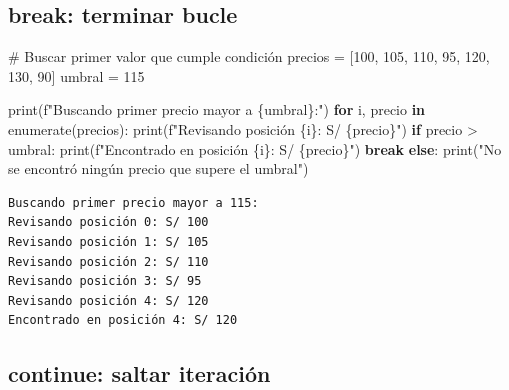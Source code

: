 \documentclass[
  doc,
  floatsintext,
  longtable,
  a4paper,
  nolmodern,
  notxfonts,
  notimes,
  12pt,
  colorlinks=true,linkcolor=blue,citecolor=blue,urlcolor=blue]{apa7}
\newenvironment{Shaded}{\begin{snugshade}}{\end{snugshade}}
\newcommand{\BuiltInTok}[1]{\textcolor[rgb]{0.00,0.23,0.31}{#1}}
\newcommand{\CommentTok}[1]{\textcolor[rgb]{0.37,0.37,0.37}{#1}}
\newcommand{\ControlFlowTok}[1]{\textcolor[rgb]{0.00,0.23,0.31}{\textbf{#1}}}
\newcommand{\DecValTok}[1]{\textcolor[rgb]{0.68,0.00,0.00}{#1}}
\newcommand{\KeywordTok}[1]{\textcolor[rgb]{0.00,0.23,0.31}{\textbf{#1}}}
\newcommand{\NormalTok}[1]{\textcolor[rgb]{0.00,0.23,0.31}{#1}}
\newcommand{\OperatorTok}[1]{\textcolor[rgb]{0.37,0.37,0.37}{#1}}
\newcommand{\SpecialCharTok}[1]{\textcolor[rgb]{0.37,0.37,0.37}{#1}}
\newcommand{\SpecialStringTok}[1]{\textcolor[rgb]{0.13,0.47,0.30}{#1}}
\newcommand{\StringTok}[1]{\textcolor[rgb]{0.13,0.47,0.30}{#1}}
\begin{document}
\subsection{break: terminar bucle}\label{break-terminar-bucle}

\begin{Shaded}
\begin{Highlighting}[]
\CommentTok{\# Buscar primer valor que cumple condición}
\NormalTok{precios }\OperatorTok{=}\NormalTok{ [}\DecValTok{100}\NormalTok{, }\DecValTok{105}\NormalTok{, }\DecValTok{110}\NormalTok{, }\DecValTok{95}\NormalTok{, }\DecValTok{120}\NormalTok{, }\DecValTok{130}\NormalTok{, }\DecValTok{90}\NormalTok{]}
\NormalTok{umbral }\OperatorTok{=} \DecValTok{115}

\BuiltInTok{print}\NormalTok{(}\SpecialStringTok{f"Buscando primer precio mayor a }\SpecialCharTok{\{}\NormalTok{umbral}\SpecialCharTok{\}}\SpecialStringTok{:"}\NormalTok{)}
\ControlFlowTok{for}\NormalTok{ i, precio }\KeywordTok{in} \BuiltInTok{enumerate}\NormalTok{(precios):}
    \BuiltInTok{print}\NormalTok{(}\SpecialStringTok{f"Revisando posición }\SpecialCharTok{\{}\NormalTok{i}\SpecialCharTok{\}}\SpecialStringTok{: S/ }\SpecialCharTok{\{}\NormalTok{precio}\SpecialCharTok{\}}\SpecialStringTok{"}\NormalTok{)}
    \ControlFlowTok{if}\NormalTok{ precio }\OperatorTok{\textgreater{}}\NormalTok{ umbral:}
        \BuiltInTok{print}\NormalTok{(}\SpecialStringTok{f"Encontrado en posición }\SpecialCharTok{\{}\NormalTok{i}\SpecialCharTok{\}}\SpecialStringTok{: S/ }\SpecialCharTok{\{}\NormalTok{precio}\SpecialCharTok{\}}\SpecialStringTok{"}\NormalTok{)}
        \ControlFlowTok{break}
\ControlFlowTok{else}\NormalTok{:}
    \BuiltInTok{print}\NormalTok{(}\StringTok{"No se encontró ningún precio que supere el umbral"}\NormalTok{)}
\end{Highlighting}
\end{Shaded}

\begin{verbatim}
Buscando primer precio mayor a 115:
Revisando posición 0: S/ 100
Revisando posición 1: S/ 105
Revisando posición 2: S/ 110
Revisando posición 3: S/ 95
Revisando posición 4: S/ 120
Encontrado en posición 4: S/ 120
\end{verbatim}

\subsection{continue: saltar
iteración}\label{continue-saltar-iteraciuxf3n}
\end{document}
